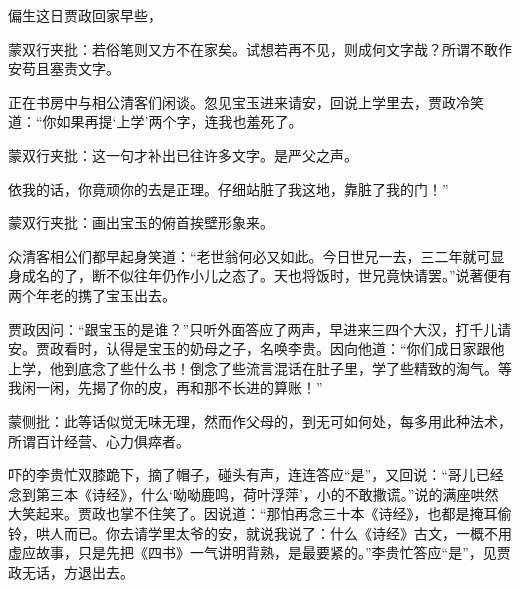 \begin{parag}
    偏生这日贾政回家早些，\begin{note}蒙双行夹批：若俗笔则又方不在家矣。试想若再不见，则成何文字哉？所谓不敢作安苟且塞责文字。\end{note}正在书房中与相公清客们闲谈。忽见宝玉进来请安，回说上学里去，贾政冷笑道：“你如果再提‘上学’两个字，连我也羞死了。\begin{note}蒙双行夹批：这一句才补出已往许多文字。是严父之声。\end{note}依我的话，你竟顽你的去是正理。仔细站脏了我这地，靠脏了我的门！”\begin{note}蒙双行夹批：画出宝玉的俯首挨壁形象来。\end{note}众清客相公们都早起身笑道：“老世翁何必又如此。今日世兄一去，三二年就可显身成名的了，断不似往年仍作小儿之态了。天也将饭时，世兄竟快请罢。”说著便有两个年老的携了宝玉出去。
\end{parag}


\begin{parag}
    贾政因问：“跟宝玉的是谁？”只听外面答应了两声，早进来三四个大汉，打千儿请安。贾政看时，认得是宝玉的奶母之子，名唤李贵。因向他道：“你们成日家跟他上学，他到底念了些什么书！倒念了些流言混话在肚子里，学了些精致的淘气。等我闲一闲，先揭了你的皮，再和那不长进的算账！”\begin{note}蒙侧批：此等话似觉无味无理，然而作父母的，到无可如何处，每多用此种法术，所谓百计经营、心力俱瘁者。\end{note}吓的李贵忙双膝跪下，摘了帽子，碰头有声，连连答应“是”，又回说：“哥儿已经念到第三本《诗经》，什么‘呦呦鹿鸣，荷叶浮萍’，小的不敢撒谎。”说的满座哄然大笑起来。贾政也掌不住笑了。因说道：“那怕再念三十本《诗经》，也都是掩耳偷铃，哄人而已。你去请学里太爷的安，就说我说了：什么《诗经》古文，一概不用虚应故事，只是先把《四书》一气讲明背熟，是最要紧的。”李贵忙答应“是”，见贾政无话，方退出去。
\end{parag}


